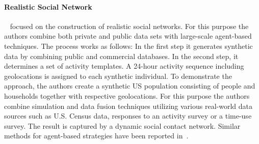 
\paragraph{Realistic Social Network}
~\cite{Barrett:2009:GAL:1995456.1995598} focused on the construction of
realistic social networks. For this purpose the authors combine both 
private and public data sets with large-scale agent-based techniques. The process works as
follows: In the first step it generates  synthetic data by combining public and
commercial databases. In the second step, it determines a set of activity
templates. A 24-hour activity sequence including geolocations is assigned to
each synthetic individual. To demonstrate the approach, the authors create a
synthetic US population consisting of people and households together with
respective geolocations. For this purpose the authors combine simulation and
data fusion techniques utilizing various real-world data sources such as U.S.
Census data, responses to an activity survey or a time-use survey.
The result is captured by a dynamic social contact network. Similar methods for
agent-based strategies have been reported
in~\cite{Bernstein:2013:SAS:2499604.2499609}.

